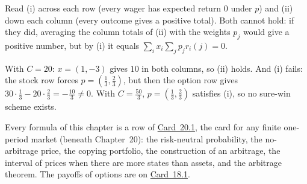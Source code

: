 Read (i) across each row (every wager has expected return $0$ under $p$) and (ii) down each column (every outcome gives a positive total). Both cannot hold: if they did, averaging the column totals of (ii) with the weights $p_j$ would give a positive number, but by (i) it equals $\sum_ix_i\sum_jp_jr_i(j)=0$.

\begin{example}
With $C=20$: $x=(1,-3)$ gives $10$ in both columns, so (ii) holds. And (i) fails: the stock row forces $p=(\frac13,\frac23)$, but then the option row gives $30\cdot\frac13-20\cdot\frac23=-\frac{10}3\ne0$. With $C=\frac{50}3$, $p=(\frac13,\frac23)$ satisfies (i), so no sure-win scheme exists.
\end{example}


Every formula of this chapter is a row of \hyperref[card:finite]{Card~20.1}, the card for any finite one-period market (beneath Chapter~20): the risk-neutral probability, the no-arbitrage price, the copying portfolio, the construction of an arbitrage, the interval of prices when there are more states than assets, and the arbitrage theorem. The payoffs of options are on \hyperref[card:payoff]{Card~18.1}.
